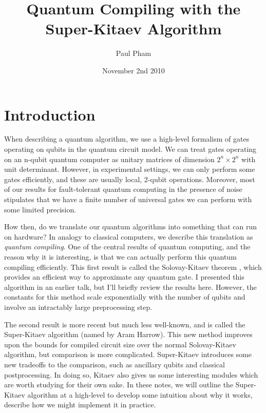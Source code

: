 \documentclass{article}
\title{Quantum Compiling with the Super-Kitaev Algorithm}
\date{November 2nd 2010}
\author{Paul Pham}
\theoremstyle{plain}
\begin{document}
\newcommand{\braket}[2]{\langle #1|#2 \rangle}
\newcommand{\normtwo}{\frac{1}{\sqrt{2}}}
\newcommand{\norm}[1]{\parallel #1 \parallel}

\maketitle

\section{Introduction}

When describing a quantum algorithm, we use a high-level formalism of
gates operating on qubits in the quantum circuit model.
We can treat gates operating on an n-qubit quantum computer as unitary
matrices of dimension $2^n \times 2^n$ with unit determinant.
However, in experimental settings,
we can only perform some gates efficiently, and these are usually local,
2-qubit operations. Moreover, most of our results for fault-tolerant
quantum computing in the presence of noise stipulates that we have a finite
number of universal gates we can perform with some limited precision.

How then, do we translate our quantum algorithms into something that can run
on hardware? In analogy to classical computers, we describe this translation
as {\em quantum compiling}. One of the central results of quantum computing,
and the reason why it is interesting, is that we can actually perform this
quantum compiling efficiently. This first result is called the
Solovay-Kitaev theorem \cite{Dawson2005}, which provides an efficient way to
approximate any quantum gate. I presented this algorithm in an earlier talk, but
I'll briefly review the results here. However, the constants for this method
scale exponentially with the number of qubits and involve an intractably
large preprocessing step.

The second result is more recent but much less well-known, and is called
the Super-Kitaev algorithm (named by Aram Harrow). This new method improves upon
the bounds for compiled circuit size over the normal Solovay-Kitaev algorithm,
but comparison is more complicated. Super-Kitaev introduces some new tradeoffs to the
comparison, such as ancillary qubits and classical postprocessing. In doing so,
Kitaev also gives us some interesting modules which are worth studying for
their own sake. In these notes, we will outline the Super-Kitaev algorithm at
a high-level to develop some intuition about why it works, describe how we 
might implement it in practice.
\end{document}
